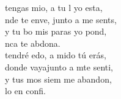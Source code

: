 \begin{cancion}
	\begin{chorus}%
	 tengas mio, a tu l yo esta,\\
	nde te enve, junto a me sents, \\
	y  tu bo mis paras yo pond,\\
	nca te abdona.\\
\jump
	 tendré edo, a mido tú erás,\\
	donde vayajunto a mte senti,\\
	y  tus mos siem me abandon, \\
	lo en  confi. \\
	\end{chorus}%
	\jump\\
\end{cancion}%

